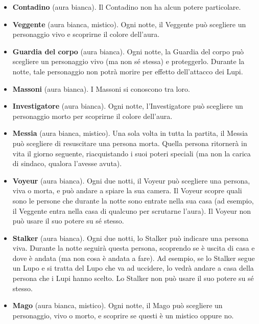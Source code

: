 \documentclass[a4paper,10pt]{article}
\begin{document}
\begin{itemize}
 \item {\bf Contadino} (aura bianca). Il Contadino non ha alcun potere particolare.
 
 \item {\bf Veggente} (aura bianca, mistico). Ogni notte, il Veggente può scegliere un personaggio vivo e scoprirne il colore dell'aura.

 \item {\bf Guardia del corpo} (aura bianca). Ogni notte, la Guardia del corpo può scegliere un personaggio vivo (ma non sé stessa) e proteggerlo. Durante la notte, tale personaggio non potrà morire per effetto dell'attacco dei Lupi.
 
 \item {\bf Massoni} (aura bianca). I Massoni si conoscono tra loro.
 
 \item {\bf Investigatore} (aura bianca). Ogni notte, l'Investigatore può scegliere un personaggio morto per scoprirne il colore dell'aura.

 \item {\bf Messia} (aura bianca, mistico). Una sola volta in tutta la partita, il Messia può scegliere di resuscitare una persona morta. Quella persona ritornerà in vita il giorno seguente, riacquistando i suoi poteri speciali (ma non la carica di sindaco, qualora l'avesse avuta).

 \item {\bf Voyeur} (aura bianca). Ogni due notti, il Voyeur può scegliere una persona, viva o morta, e può andare a spiare la sua camera. Il Voyeur scopre quali sono le persone che durante la notte sono entrate nella sua casa (ad esempio, il Veggente entra nella casa di qualcuno per scrutarne l'aura).
 Il Voyeur non può usare il suo potere su sé stesso.

 \item {\bf Stalker} (aura bianca). Ogni due notti, lo Stalker può indicare una persona viva. Durante la notte seguirà questa persona, scoprendo se è uscita di casa e dove è andata (ma non cosa è andata a fare).
 Ad esempio, se lo Stalker segue un Lupo e si tratta del Lupo che va ad uccidere, lo vedrà andare a casa della persona che i Lupi hanno scelto.
 Lo Stalker non può usare il suo potere su sé stesso.
 
 \item {\bf Mago} (aura bianca, mistico). Ogni notte, il Mago può scegliere un personaggio, vivo o morto, e scoprire se questi è un mistico oppure no.
 

\end{itemize}
\end{document}

